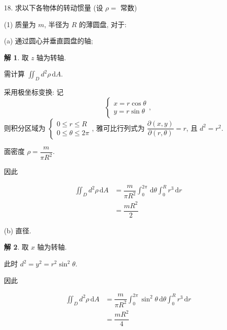 \documentclass[a4paper,12pt]{article}
\theoremstyle{definition}
\newtheorem*{sol}{解}
\begin{document}
18. 求以下各物体的转动惯量 (设 $\rho = $ 常数)

(1) 质量为 $m$, 半径为 $R$ 的薄圆盘, 对于:

(a) 通过圆心并垂直圆盘的轴;
\begin{sol}
    取 $z$ 轴为转轴.

    需计算 $\iint_D d^2\rho\,\mathrm{d}A$.

    采用极坐标变换: 记
    $$\begin{cases}
        x=r\cos\theta \\
        y=r\sin\theta
    \end{cases},$$
    则积分区域为 $\begin{cases}
        0\leq r \leq R \\
        0\leq \theta \leq 2\pi
    \end{cases}$, 雅可比行列式为 $\dfrac{\partial(x,y)}{\partial(r,\theta)}=r$, 且 $d^2=r^2$.

    面密度 $\rho=\dfrac{m}{\pi R^2}$.

    因此

    \begin{align*}
        \iint_D d^2\rho\,\mathrm{d}A
         & =\dfrac{m}{\pi R^2}\int_0^{2\pi}\,\mathrm{d}\theta\int_0^R r^3\,\mathrm{d}r \\
         & =\dfrac{mR^2}{2}
    \end{align*}
\end{sol}

(b) 直径.
\begin{sol}
    取 $x$ 轴为转轴.

    此时 $d^2=y^2=r^2\sin^2\theta$.

    因此

    \begin{align*}
        \iint_D d^2\rho\,\mathrm{d}A
         & =\dfrac{m}{\pi R^2}\int_0^{2\pi}\sin^2\theta\,\mathrm{d}\theta\int_0^R r^3\,\mathrm{d}r \\
         & =\dfrac{mR^2}{4}
    \end{align*}
\end{sol}
\end{document}
